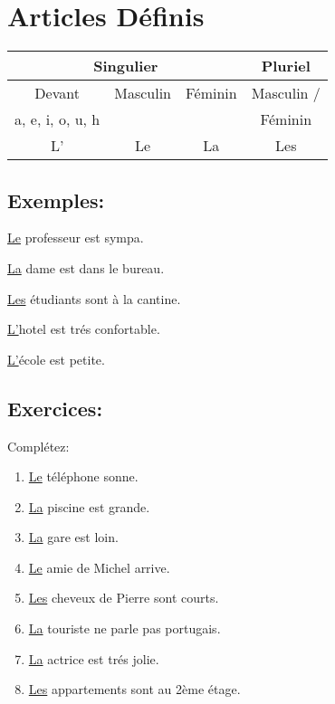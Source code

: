 \section{Articles Définis}

\begin{tabular}{|c|c|c|c|}
    \hline
    \multicolumn{3}{|c|}{Singulier} & Pluriel \\
    \hline
    Devant & Masculin & Féminin & Masculin / \\
    a, e, i, o, u, h & \ & \ & Féminin \\
    \hline 
    L' & Le & La & Les \\
    \hline
\end{tabular}

\subsection{Exemples:}

\underline{Le} professeur est sympa.

\underline{La} dame est dans le bureau.

\underline{Les} étudiants sont à la cantine.

\underline{L'}hotel est trés confortable.

\underline{L'}école est petite.

\subsection{Exercices:}

Complétez:

\begin{enumerate}
    \item \underline{Le} téléphone sonne.
    \item \underline{La} piscine est grande.
    \item \underline{La} gare est loin.
    \item \underline{Le} amie de Michel arrive.
    \item \underline{Les} cheveux de Pierre sont courts.
    \item \underline{La} touriste ne parle pas portugais.
    \item \underline{La} actrice est trés jolie.
    \item \underline{Les} appartements sont au 2ème étage.
\end{enumerate}